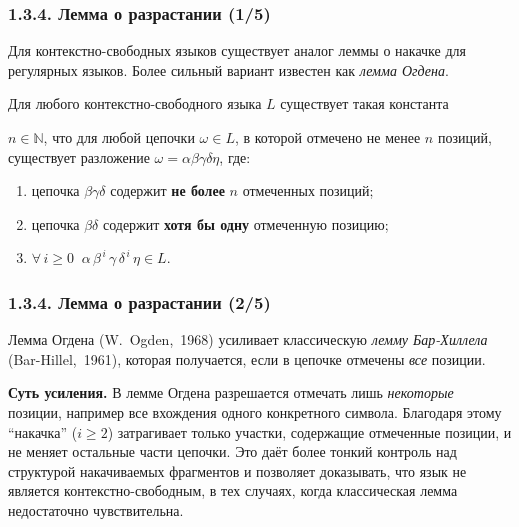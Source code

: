 \documentclass[mathserif,12pt,aspectratio=169]{beamer}
\renewcommand{\index}[1]{}
\def\odmkey#1#2{{\it\color{red} #1}\index{#2}}
\let\ge\geqslant
\begin{document}
\begin{frame}
  \frametitle{1.3.4. Лемма о разрастании (1/5)}

  Для контекстно-свободных языков существует аналог леммы о накачке
  для регулярных языков. Более сильный вариант известен как
  \odmkey{лемма Огдена}{Лемма!Огдена}.

  \begin{theorem}
    Для любого контекстно-свободного языка $L$ существует такая константа
    
    $n \in \mathbb{N}$, что для любой цепочки $\omega\in L$, в которой отмечено
    не менее $n$ позиций, существует разложение
    $\omega = \alpha\beta\gamma\delta\eta$, где:
    \begin{enumerate}
      \item цепочка $\beta\gamma\delta$ содержит \textbf{не более} $n$ отмеченных позиций;
      \item цепочка $\beta\delta$ содержит \textbf{хотя бы одну} отмеченную позицию;
      \item $\forall\,i\ge 0\;\; \alpha\,\beta^{\,i}\,\gamma\,\delta^{\,i}\,\eta \in L$.
    \end{enumerate}
  \end{theorem}

\end{frame}

\begin{frame}
  \frametitle{1.3.4. Лемма о разрастании (2/5)}

  \begin{remark}
    Лемма Огдена (W.~Ogden,~1968) усиливает классическую
    \odmkey{лемму Бар-Хиллела}{Лемма!Бар-Хиллела}
    (Bar-Hillel,~1961), которая получается, если в цепочке
    отмечены \emph{все} позиции.

    \medskip
    \textbf{Суть усиления.}
    В лемме Огдена разрешается отмечать лишь \emph{некоторые} позиции,
    например все вхождения одного конкретного символа.  Благодаря этому
    ``накачка'' ($i\ge 2$) затрагивает только участки, содержащие отмеченные
    позиции, и не меняет остальные части цепочки.  Это даёт более тонкий
    контроль над структурой накачиваемых фрагментов и позволяет доказывать,
    что язык не является контекстно-свободным, в тех случаях, когда
    классическая лемма недостаточно чувствительна.
  \end{remark}

\end{frame}
\end{document}
